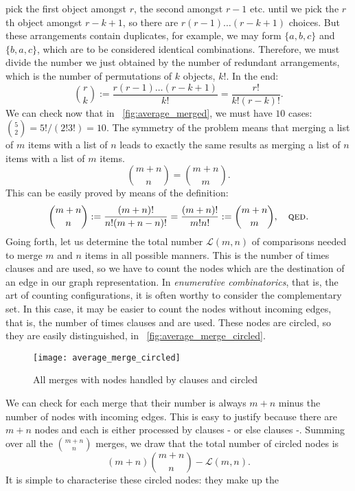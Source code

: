 pick the first object amongst \(r\), the second amongst \(r-1\)
etc. until we pick the \(r\)th object amongst \(r-k+1\), so there are
\(r(r-1)\dots(r-k+1)\) choices. But these arrangements contain
duplicates, for example, we may form \(\{a,b,c\}\) and \(\{b,a,c\}\),
which are to be considered identical combinations. Therefore, we must
divide the number we just obtained by the number of redundant
arrangements, which is the number of permutations of \(k\) objects,
\(k!\). In the end:
\[
\binom{r}{k} := \frac{r(r-1)\ldots(r-k+1)}{k!} =
\frac{r!}{k!(r-k)!}.
\]
We can check now that in \fig~\vref{fig:average_merged}, we must have
\(10\) cases: \(\binom{5}{2} = 5!/(2!3!) = 10\). The symmetry of the
problem means that merging a list of \(m\) items with a list of \(n\)
leads to exactly the same results as merging a list of \(n\) items
with a list of \(m\) items.
\[
\binom{m+n}{n} = \binom{m+n}{m}.
\]
This can be easily proved by means of the definition:
\[
\binom{m+n}{n} := \frac{(m+n)!}{n!(m+n-n)!} =
\frac{(m+n)!}{m!n!} := \binom{m+n}{m},\quad
\text{\textsc{qed.}}
\]
Going forth, let us determine the total number \(\mathcal{L}(m,n)\) of
comparisons needed to merge \(m\) and \(n\) items in all possible
manners. This is the number of times clauses \clause{\gamma} and
\clause{\delta} are used, so we have to count the nodes which are the
destination of an edge in our graph representation. In
\emph{enumerative combinatorics}, that is, the art of counting
configurations, it is often worthy to consider the complementary
set. In this case, it may be easier to count the nodes without
incoming edges, that is, the number of times clauses \clause{\alpha} and
\clause{\beta} are used. These nodes are circled, so they are easily
distinguished, in \fig~\vref{fig:average_merge_circled}.
\begin{figure}[b]
\centering
\texttt{[image: average\_merge\_circled]}
\caption{All merges with nodes handled by clauses \clause{\alpha} and
  \clause{\beta} circled\label{fig:average_merge_circled}}
\end{figure}
We can check for each merge that their number is always \(m+n\) minus
the number of nodes with incoming edges. This is easy to justify
because there are \(m+n\) nodes and each is either processed by
clauses \clause{\alpha}\hyp{}\clause{\beta} or else clauses
\clause{\gamma}\hyp{}\clause{\delta}. Summing over all the
\(\binom{m+n}{n}\) merges, we draw that the total number of circled
nodes is
\[
(m + n) \binom{m+n}{n} - \mathcal{L}(m,n).
\]
It is simple to characterise these circled nodes: they make up the
